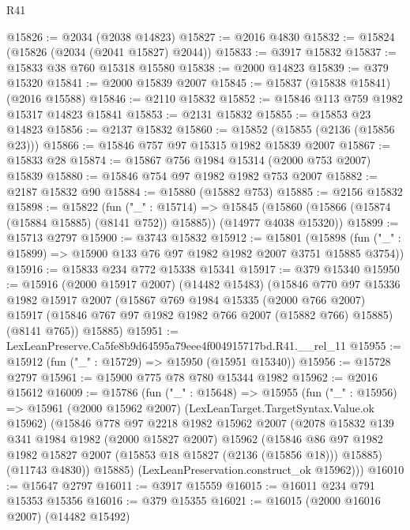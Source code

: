 \begin{lexlean}{R41}
\begin{coremodule}
@15826 := @2034 (@2038 @14823)
@15827 := @2016 @4830
@15832 := @15824 (@15826 (@2034 (@2041 @15827) @2044))
@15833 := @3917 @15832
@15837 := @15833 @38 @760 @15318 @15580
@15838 := @2000 @14823
@15839 := @379 @15320
@15841 := @2000 @15839 @2007
@15845 := @15837 (@15838 @15841) (@2016 @15588)
@15846 := @2110 @15832
@15852 := @15846 @113 @759 @1982 @15317 @14823 @15841
@15853 := @2131 @15832
@15855 := @15853 @23 @14823
@15856 := @2137 @15832
@15860 := @15852 (@15855 (@2136 (@15856 @23)))
@15866 := @15846 @757 @97 @15315 @1982 @15839 @2007
@15867 := @15833 @28
@15874 := @15867 @756 @1984 @15314 (@2000 @753 @2007) @15839
@15880 := @15846 @754 @97 @1982 @1982 @753 @2007
@15882 := @2187 @15832 @90
@15884 := @15880 (@15882 @753)
@15885 := @2156 @15832
@15898 := @15822
    (fun ("_" : @15714) =>
    @15845 (@15860 (@15866 (@15874 (@15884 @15885) (@8141 @752)) @15885)) (@14977 @4038 @15320))
@15899 := @15713 @2797
@15900 := @3743 @15832
@15912 := @15801
    (@15898 (fun ("_" : @15899) => @15900 @133 @76 @97 @1982 @1982 @2007 @3751 @15885 @3754))
@15916 := @15833 @234 @772 @15338 @15341
@15917 := @379 @15340
@15950 := @15916
    (@2000 @15917 @2007)
    (@14482 @15483)
    (@15846
      @770
      @97
      @15336
      @1982
      @15917
      @2007
      (@15867
        @769
        @1984
        @15335
        (@2000 @766 @2007)
        @15917
        (@15846 @767 @97 @1982 @1982 @766 @2007 (@15882 @766) @15885)
        (@8141 @765))
      @15885)
@15951 := LexLeanPreserve.Ca5fe8b9d64595a79eee4f004915717bd.R41.__rel_11
@15955 := @15912 (fun ("_" : @15729) => @15950 (@15951 @15340))
@15956 := @15728 @2797
@15961 := @15900 @775 @78 @780 @15344 @1982
@15962 := @2016 @15612
@16009 := @15786
    (fun ("_" : @15648) =>
    @15955
      (fun ("_" : @15956) =>
      @15961
        (@2000 @15962 @2007)
        (LexLeanTarget.TargetSyntax.Value.ok @15962)
        (@15846
          @778
          @97
          @2218
          @1982
          @15962
          @2007
          (@2078
            @15832
            @139
            @341
            @1984
            @1982
            (@2000 @15827 @2007)
            @15962
            (@15846
              @86
              @97
              @1982
              @1982
              @15827
              @2007
              (@15853 @18 @15827 (@2136 (@15856 @18)))
              @15885)
            (@11743 @4830))
          @15885)
        (LexLeanPreservation.construct_ok @15962)))
@16010 := @15647 @2797
@16011 := @3917 @15559
@16015 := @16011 @234 @791 @15353 @15356
@16016 := @379 @15355
@16021 := @16015 (@2000 @16016 @2007) (@14482 @15492)

\end{coremodule}
\end{lexlean}
